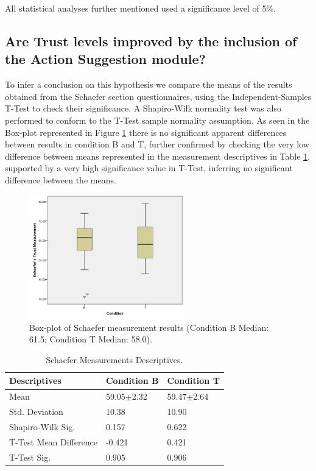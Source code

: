 All statistical analyses further mentioned used a significance level of 5\%.

\subsection*{Are Trust levels improved by the inclusion of the Action Suggestion module?}
To infer a conclusion on this hypothesis we compare the means of the results obtained from the Schaefer section questionnaires, using the Independent-Samples T-Test to check their significance. A Shapiro-Wilk normality test was also performed to conform to the T-Test sample normality assumption.  As seen in the Box-plot represented in Figure \ref{fig:SchaeferMeasurementResults} there is no significant apparent differences between results in condition B and T, further confirmed by checking the very low difference between means represented in the measurement descriptives in Table \ref{tbl:SchaeferMeasurementsDescriptives}, supported by a very high significance value in T-Test, inferring no significant difference between the means.

\begin{figure}[hbt]
    \centering
    \includegraphics[width=0.6\textwidth]{graphs/Schaefer.png}
    \caption{Box-plot of Schaefer measurement results (Condition B Median: 61.5; Condition T Median: 58.0).}
    \label{fig:SchaeferMeasurementResults}
\end{figure}

\begin{table}[h]
    \centering
    \begin{tabular}{|l|l|l|}
        \hline
        \textbf{Descriptives}       &  \textbf{Condition B}     & \textbf{Condition T}  \\ \hline
        Mean                        &  59.05$\pm$2.32           & 59.47$\pm$2.64        \\ \hline
        Std. Deviation              &  10.38                    & 10.90                 \\ \hline
        Shapiro-Wilk Sig.           &  0.157                    & 0.622                 \\ \hline
        T-Test Mean Difference      &  -0.421                   & 0.421                 \\ \hline
        T-Test Sig.                 &  0.905                    & 0.906                 \\ \hline
    \end{tabular}
    \caption{Schaefer Measurements Descriptives.}
    \label{tbl:SchaeferMeasurementsDescriptives}
\end{table}

